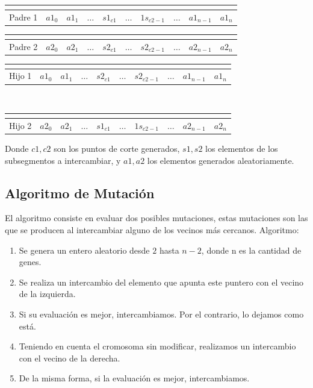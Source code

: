 \documentclass{article}
\def\MCe{\multicolumn{1}{c}{}}
\begin{document}
\begin{tabular}{|l|*9{c|}}
	\MCe \\\hline
	Padre 1 & $a1_0$ & $a1_1$ & $\dots$ & $s1_{c1}$ & $\dots$ & $1s_{c2-1}$ & $\dots$ & $a1_{n-1}$ & $a1_{n}$ \\\hline
\end{tabular}

\begin{tabular}{|l|*9{c|}}
	\MCe \\\hline
	Padre 2 & $a2_0$ & $a2_1$ & $\dots$ & $s2_{c1}$ & $\dots$ & $s2_{c2-1}$ & $\dots$ & $a2_{n-1}$ & $a2_{n}$ \\\hline
\end{tabular}
\bigskip

\begin{tabular}{|l|*9{c|}}
	\MCe \\\hline
	Hijo 1 & $a1_0$ & $a1_1$ & $\dots$ & $s2_{c1}$ & $\dots$ & $s2_{c2-1}$ & $\dots$ & $a1_{n-1}$ & $a1_{n}$ \\\hline
\end{tabular}

\\
\begin{tabular}{|l|*9{c|}}
	\MCe \\\hline
	Hijo 2 & $a2_0$ & $a2_1$ & $\dots$ & $s1_{c1}$ & $\dots$ & $1s_{c2-1}$ & $\dots$ & $a2_{n-1}$ & $a2_{n}$ \\\hline
\end{tabular}
\newline\newline
Donde $c1, c2$ son los puntos de corte generados, $s1, s2$ los elementos de los subsegmentos a intercambiar, y $a1, a2$ los elementos generados aleatoriamente.

\subsection{Algoritmo de Mutación}
El algoritmo consiste en evaluar dos posibles mutaciones, estas mutaciones son las que se producen al intercambiar alguno de los vecinos más cercanos.
Algoritmo:
\begin{enumerate}
	\item Se genera un entero aleatorio desde $2$ hasta $n-2$, donde n es la cantidad de genes.
	\item Se realiza un intercambio del elemento que apunta este puntero con el vecino de la izquierda.
	\item Si su evaluación es mejor, intercambiamos. Por el contrario, lo dejamos como está.
	\item Teniendo en cuenta el cromosoma sin modificar, realizamos un intercambio con el vecino de la derecha.
	\item De la misma forma, si la evaluación es mejor, intercambiamos.
\end{enumerate}
\end{document}
